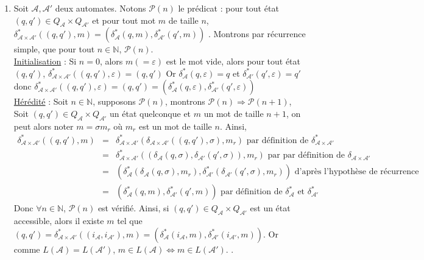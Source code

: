 \documentclass{article}
\newcommand{\bb}[1]{\mathbb{#1}}
\begin{document}
\begin{enumerate}
    \item \label{itm:rec2} Soit $\mathcal{A}, \mathcal{A}'$ deux automates. \sloppy \newline
    Notons $\mathcal{P}(n)$ le prédicat : \og pour tout état $(q, q') \in Q_\mathcal{A} \times Q_{\mathcal{A}'}$ et pour tout mot $m$ de taille $n$, $\delta_{\mathcal{A} \times \mathcal{A}'}^*((q, q'), m) = (\delta_\mathcal{A}^*(q, m),\delta_{\mathcal{A}'}^*(q', m))$ \fg. Montrons par récurrence simple, que pour tout $n \in \bb{N}$, $\mathcal{P}(n)$. \\[2mm] 
    \underline{Initialisation} : Si $n = 0$, alors $m (= \varepsilon)$ est le mot vide, alors pour tout état $(q, q')$, $\delta_{\mathcal{A} \times \mathcal{A}'}^*((q, q'), \varepsilon) = (q, q')$ \newline 
    Or $\delta_\mathcal{A}^*(q, \varepsilon) = q$ et $\delta_{\mathcal{A}'}^*(q', \varepsilon) = q'$ donc $\delta_{\mathcal{A} \times \mathcal{A}'}^*((q, q'), \varepsilon) = (q, q') = (\delta_\mathcal{A}^*(q, \varepsilon), \delta_{\mathcal{A}'}^*(q', \varepsilon))$ \\[2mm]
    \underline{Hérédité} : Soit $n \in \bb{N}$, supposons $\mathcal{P}(n)$, montrons $\mathcal{P}(n) \Rightarrow \mathcal{P}(n + 1)$, \newline
    Soit $(q, q') \in Q_\mathcal{A} \times Q_{\mathcal{A}'}$ un état quelconque et $m$ un mot de taille $n + 1$, on peut alors noter $m = \sigma m_r$ où $m_r$ est un mot de taille $n$. Ainsi, \begin{eqnarray*}
        \delta_{\mathcal{A} \times \mathcal{A}'}^*((q, q'), m) & = & \delta_{\mathcal{A} \times \mathcal{A}'}^*(\delta_{\mathcal{A} \times \mathcal{A}'}((q, q'), \sigma), m_r) \text{ par définition de } \delta_{\mathcal{A} \times \mathcal{A}'}^* \\
        & = & \delta_{\mathcal{A} \times \mathcal{A}'}^*((\delta_\mathcal{A}(q, \sigma),\delta_{\mathcal{A}'}(q', \sigma)), m_r) \text{ par par définition de } \delta_{\mathcal{A} \times \mathcal{A}'} \\
        & = & (\delta_\mathcal{A}^*(\delta_\mathcal{A}(q, \sigma), m_r),\delta_{\mathcal{A}'}^*(\delta_{\mathcal{A}'}(q', \sigma), m_r)) \text{ d'après l'hypothèse de récurrence} \\
        & = & (\delta_\mathcal{A}^*(q, m),\delta_{\mathcal{A}'}^*(q',  m)) \text{ par définition de $\delta_\mathcal{A}^*$ et $\delta_{\mathcal{A}'}^*$}
    \end{eqnarray*}
    Donc $\forall n \in \bb{N}$, $\mathcal{P}(n)$ est vérifié. Ainsi, si $(q, q') \in Q_\mathcal{A} \times Q_{\mathcal{A}'}$ est un état accessible, alors il existe $m$ tel que $(q, q') = \delta_{\mathcal{A} \times \mathcal{A}'}^*((i_\mathcal{A}, i_{\mathcal{A}'}), m) = (\delta_\mathcal{A}^*(i_\mathcal{A}, m),\delta_{\mathcal{A}'}^*(i_\mathcal{A'}, m))$.\newline 
    Or comme $L(\mathcal{A}) = L(\mathcal{A}')$, $m \in L(\mathcal{A}) \Longleftrightarrow  m \in L(\mathcal{A'})$.  .


\end{enumerate}
\end{document}
